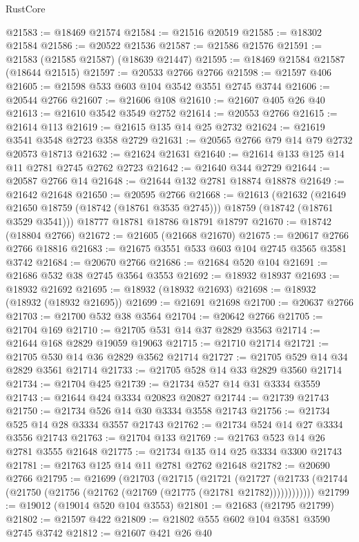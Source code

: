 \begin{lexlean}{RustCore}
\begin{coremodule}
@21583 := @18469 @21574
@21584 := @21516 @20519
@21585 := @18302 @21584
@21586 := @20522 @21536
@21587 := @21586 @21576
@21591 := @21583 (@21585 @21587) (@18639 @21447)
@21595 := @18469 @21584 @21587 (@18644 @21515)
@21597 := @20533 @2766 @2766
@21598 := @21597 @406
@21605 := @21598 @533 @603 @104 @3542 @3551 @2745 @3744
@21606 := @20544 @2766
@21607 := @21606 @108
@21610 := @21607 @405 @26 @40
@21613 := @21610 @3542 @3549 @2752
@21614 := @20553 @2766
@21615 := @21614 @113
@21619 := @21615 @135 @14 @25 @2732
@21624 := @21619 @3541 @3548 @2723 @358 @2729
@21631 := @20565 @2766 @79 @14 @79 @2732 @20573 @18713
@21632 := @21624 @21631
@21640 := @21614 @133 @125 @14 @11 @2781 @2745 @2762 @2723
@21642 := @21640 @344 @2729
@21644 := @20587 @2766 @14
@21648 := @21644 @132 @2781 @18874 @18878
@21649 := @21642 @21648
@21650 := @20595 @2766
@21668 := @21613
    (@21632
      (@21649 @21650 @18759 (@18742 (@18761 @3535 @2745)))
      @18759
      (@18742 (@18761 @3529 @3541)))
    @18777
    @18781
    @18786
    @18791
    @18797
@21670 := @18742 (@18804 @2766)
@21672 := @21605 (@21668 @21670)
@21675 := @20617 @2766 @2766 @18816
@21683 := @21675 @3551 @533 @603 @104 @2745 @3565 @3581 @3742
@21684 := @20670 @2766
@21686 := @21684 @520 @104
@21691 := @21686 @532 @38 @2745 @3564 @3553
@21692 := @18932 @18937
@21693 := @18932 @21692
@21695 := @18932 (@18932 @21693)
@21698 := @18932 (@18932 (@18932 @21695))
@21699 := @21691 @21698
@21700 := @20637 @2766
@21703 := @21700 @532 @38 @3564
@21704 := @20642 @2766
@21705 := @21704 @169
@21710 := @21705 @531 @14 @37 @2829 @3563
@21714 := @21644 @168 @2829 @19059 @19063
@21715 := @21710 @21714
@21721 := @21705 @530 @14 @36 @2829 @3562 @21714
@21727 := @21705 @529 @14 @34 @2829 @3561 @21714
@21733 := @21705 @528 @14 @33 @2829 @3560 @21714
@21734 := @21704 @425
@21739 := @21734 @527 @14 @31 @3334 @3559
@21743 := @21644 @424 @3334 @20823 @20827
@21744 := @21739 @21743
@21750 := @21734 @526 @14 @30 @3334 @3558 @21743
@21756 := @21734 @525 @14 @28 @3334 @3557 @21743
@21762 := @21734 @524 @14 @27 @3334 @3556 @21743
@21763 := @21704 @133
@21769 := @21763 @523 @14 @26 @2781 @3555 @21648
@21775 := @21734 @135 @14 @25 @3334 @3300 @21743
@21781 := @21763 @125 @14 @11 @2781 @2762 @21648
@21782 := @20690 @2766
@21795 := @21699
    (@21703
      (@21715
        (@21721
          (@21727 (@21733 (@21744 (@21750 (@21756 (@21762 (@21769 (@21775 (@21781 @21782))))))))))))
@21799 := @19012 (@19014 @520 @104 @3553)
@21801 := @21683 (@21795 @21799)
@21802 := @21597 @422
@21809 := @21802 @555 @602 @104 @3581 @3590 @2745 @3742
@21812 := @21607 @421 @26 @40

\end{coremodule}
\end{lexlean}
